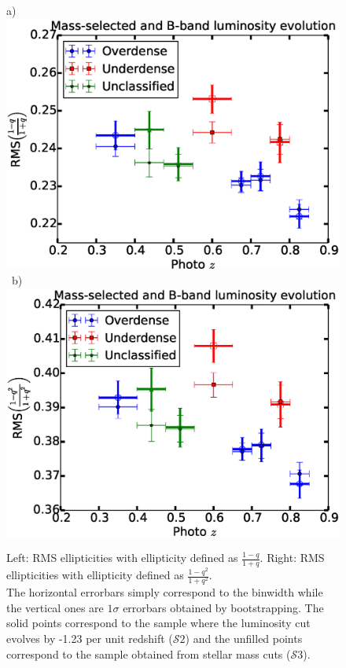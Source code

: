 \documentclass[twocolumn,useAMS,usenatbib]{mn2e}
\newcommand{\s}{\ensuremath{\mathcal{S}}}
\begin{document}
\begin{figure}
 a) \includegraphics[width=1.0\columnwidth]{rms_ellip1_Bbandevolution.eps} \
 b) \includegraphics[width=1.0\columnwidth]{rms_ellip2_Bbandevolution.eps} \\
 \caption{Left: RMS ellipticities with ellipticity defined as $\frac{1-q}{1+q}$. \; 
          Right: RMS ellipticities with ellipticity defined as $\frac{1-q^2}{1+q^2}$.\\ The horizontal errorbars simply correspond to the binwidth while the vertical ones
          are $1\sigma$ errorbars obtained by bootstrapping. The solid points correspond to the sample where the luminosity cut evolves by -1.23 per unit redshift (\s$2$) and the unfilled
          points correspond to the sample obtained from stellar mass cuts (\s$3$).}
 \label{fig:rms_ellip_Bband_mass}
\end{figure}
\end{document}
